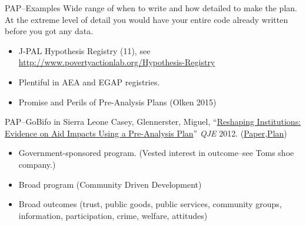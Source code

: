 \documentclass{beamer}
\begin{document}
\begin{frame}{PAP--Examples}
Wide range of when to write and how detailed to make the plan. At the extreme level of detail you would have your entire code already written before you got any data.
\begin{itemize}
\item
J-PAL Hypothesis Registry (11), see \url{http://www.povertyactionlab.org/Hypothesis-Registry}
\item
Plentiful in AEA and EGAP registries.
\item
Promise and Perils of Pre-Analysis Plans (Olken 2015)
\end{itemize}
\end{frame}

\begin{frame}{PAP--GoBifo in Sierra Leone}
Casey, Glennerster, Miguel, ``\href{http://www.nber.org/data-appendix/w17012/GBF_Supplementary_Appendix_2011-10-07.pdf}{Reshaping Institutions: Evidence on Aid Impacts Using a Pre-Analysis Plan}'' \textit{QJE} 2012. (\href{http://http://eml.berkeley.edu/~emiguel/pdfs/miguel_gbf.pdf}{Paper},\href{http://www.nber.org/data-appendix/w17012/GBF_Supplementary_Appendix_2011-10-07.pdf}{Plan})
\begin{itemize}
 \item Government-sponsored program. (Vested interest in outcome--see Toms shoe company.)
 \item Broad program (Community Driven Development)
 \item Broad outcomes (trust, public goods, public services, community groups, information, participation, crime, welfare, attitudes)
\end{itemize} 
\end{frame}
\end{document}
